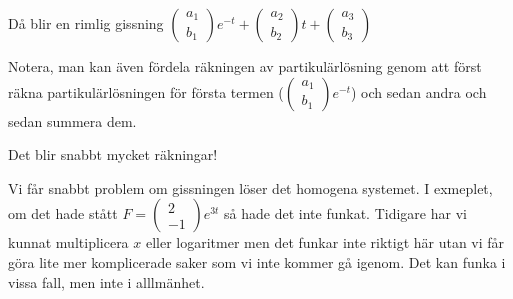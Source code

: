 \noindent Då blir en rimlig gissning $\begin{pmatrix}a_1\\b_1\end{pmatrix}e^{-t}+\begin{pmatrix}a_2\\b_2\end{pmatrix}t+\begin{pmatrix}a_3\\b_3\end{pmatrix}$
\par\bigskip
\noindent Notera, man kan även fördela räkningen av partikulärlösning genom att först räkna partikulärlösningen för första termen ($\begin{pmatrix}a_1\\b_1\end{pmatrix}e^{-t}$) och sedan andra och sedan summera dem.\par
\noindent Det blir snabbt mycket räkningar!
\par\bigskip
\noindent Vi får snabbt problem om gissningen löser det homogena systemet. I exmeplet, om det hade stått $F = \begin{pmatrix}2\\-1\end{pmatrix}e^{3t}$ så hade det inte funkat. Tidigare har vi kunnat multiplicera $x$ eller logaritmer men det funkar inte riktigt här utan vi får göra lite mer komplicerade saker som vi inte kommer gå igenom. Det kan funka i vissa fall, men inte i alllmänhet.
\par\bigskip
